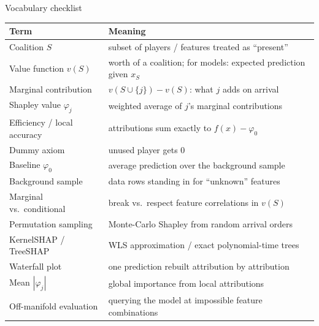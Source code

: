 \documentclass[aspectratio=169,11pt]{beamer}
\begin{document}
\begin{frame}{Vocabulary checklist}
  \footnotesize
  \begin{tabular}{ll}
    \toprule
    \textbf{Term} & \textbf{Meaning} \\
    \midrule
    Coalition $S$ & subset of players / features treated as ``present'' \\
    Value function $v(S)$ & worth of a coalition; for models: expected prediction given $x_S$ \\
    Marginal contribution & $v(S\cup\{j\})-v(S)$: what $j$ adds on arrival \\
    Shapley value $\varphi_j$ & weighted average of $j$'s marginal contributions \\
    Efficiency / local accuracy & attributions sum exactly to $f(x)-\varphi_0$ \\
    Dummy axiom & unused player gets $0$ \\
    Baseline $\varphi_0$ & average prediction over the background sample \\
    Background sample & data rows standing in for ``unknown'' features \\
    Marginal vs.\ conditional & break vs.\ respect feature correlations in $v(S)$ \\
    Permutation sampling & Monte-Carlo Shapley from random arrival orders \\
    KernelSHAP / TreeSHAP & WLS approximation / exact polynomial-time trees \\
    Waterfall plot & one prediction rebuilt attribution by attribution \\
    Mean $|\varphi_j|$ & global importance from local attributions \\
    Off-manifold evaluation & querying the model at impossible feature combinations \\
    \bottomrule
  \end{tabular}
\end{frame}
\end{document}
